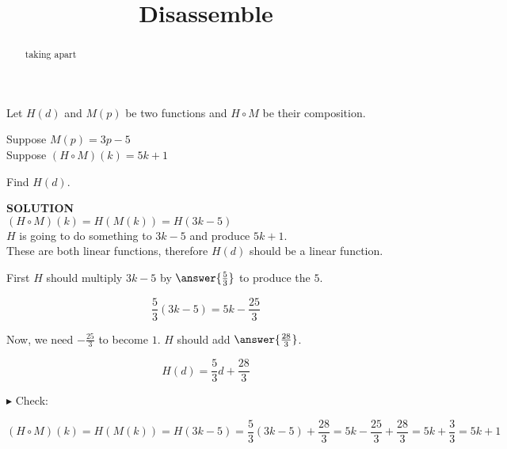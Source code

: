 \documentclass{ximera}
\title{Disassemble}
\begin{document}
\begin{abstract}
taking apart
\end{abstract}
\maketitle





\begin{example}


Let $H(d)$ and $M(p)$ be two functions and $H \circ M$ be their composition.


Suppose $M(p) = 3 p - 5$ \\

Suppose $(H \circ M)(k) = 5 k + 1$


Find $H(d)$.



\textbf{\textcolor{purple!50!blue!90!black}{SOLUTION}} \\




$(H \circ M)(k) = H(M(k)) = H(3 k - 5)$  \\



$H$ is going to do something to $3 k - 5$ and produce $5 k + 1$. \\




These are both linear functions, therefore $H(d)$ should be a linear function.


First $H$ should multiply $3 k - 5$ by $\answer{\frac{5}{3}}$ to produce the $5$.


\[    \frac{5}{3} (3 k - 5) = 5k - \frac{25}{3}   \]



Now, we need $-\frac{25}{3}$ to become $1$.  $H$ should add $\answer{\frac{28}{3}}$.

\[  H(d) =    \frac{5}{3} d +     \frac{28}{3} \]



$\blacktriangleright$ Check: 


\[    (H \circ M)(k) = H(M(k)) = H(3 k - 5) =    \frac{5}{3} (3 k - 5) +     \frac{28}{3}  = 5k - \frac{25}{3}  + \frac{28}{3}  = 5k + \frac{3}{3}  = 5k + 1\]

\end{example}
\end{document}
